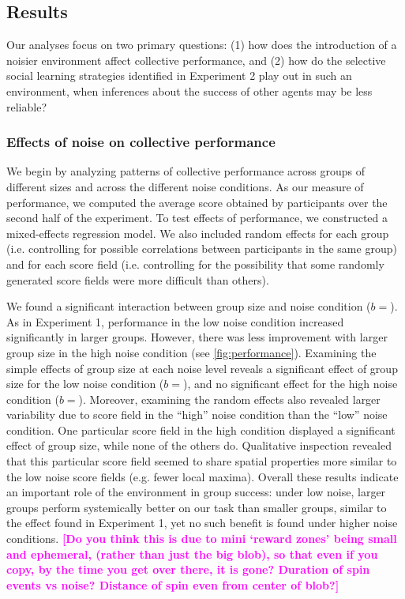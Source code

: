 \documentclass[12pt,letterpaper]{article}
\newcommand{\andrew}[1]{\textcolor{magenta}{\bf [#1]}}
\begin{document}
\subsection{Results}

Our analyses focus on two primary questions: (1) how does the introduction of a noisier environment affect collective performance, and (2) how do the selective social learning strategies identified in Experiment 2 play out in such an environment, when inferences about the success of other agents may be less reliable?

\subsubsection{Effects of noise on collective performance}

We begin by analyzing patterns of collective performance across groups of different sizes and across the different noise conditions.
As our measure of performance, we computed the average score obtained by participants over the second half of the experiment.
To test effects of performance, we constructed a mixed-effects regression model.
We also included random effects for each group (i.e. controlling for possible correlations between participants in the same group) and for each score field (i.e. controlling for the possibility that some randomly generated score fields were more difficult than others).

We found a significant interaction between group size and noise condition ($b = $). 
As in Experiment 1, performance in the low noise condition increased significantly in larger groups.  
However, there was less improvement with larger group size in the high noise condition (see \ref{fig:performance}). 
Examining the simple effects of group size at each noise level reveals a significant effect of group size for the low noise condition ($b = $), and no significant effect for the high noise condition ($b = $). 
Moreover, examining the random effects also revealed larger variability due to score field in the ``high'' noise condition than the ``low'' noise condition.
One particular score field in the high condition displayed a significant effect of group size, while none of the others do. 
Qualitative inspection revealed that this particular score field seemed to share spatial properties more similar to the low noise score fields (e.g. fewer local maxima).  
Overall these results indicate an important role of the environment in group success: under low noise, larger groups perform systemically better on our task than smaller groups, similar to the effect found in Experiment 1, yet no such benefit is found under higher noise conditions.
\andrew{Do you think this is due to mini `reward zones' being small and ephemeral, (rather than just the big blob), so that even if you copy, by the time you get over there, it is gone? Duration of spin events vs noise? Distance of spin even from center of blob?}
\end{document}
